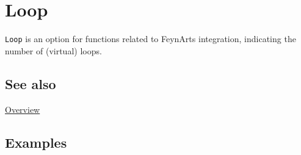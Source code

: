 \documentclass[../FeynCalcManual.tex]{subfiles}
\begin{document}
\hypertarget{loop}{%
\section{Loop}\label{loop}}

\texttt{Loop} is an option for functions related to FeynArts
integration, indicating the number of (virtual) loops.

\subsection{See also}

\hyperlink{toc}{Overview}

\subsection{Examples}
\end{document}
